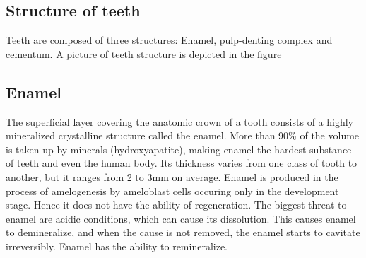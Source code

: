 \subsection{Structure of teeth}
Teeth are composed of three structures: Enamel, pulp-denting complex and cementum. A picture of teeth structure is depicted in the figure

\subsection*{Enamel}
The superficial layer covering the anatomic crown of a tooth consists of a highly mineralized crystalline structure called the enamel. More than 90\% of the volume is taken up by minerals (hydroxyapatite), making enamel the hardest substance of teeth and even the human body. Its thickness varies from one class of tooth to another, but it ranges from 2 to 3mm on average. Enamel is produced in the process of amelogenesis by ameloblast cells occuring only in the development stage. Hence it does not have the ability of regeneration. The biggest threat to enamel are acidic conditions, which can cause its dissolution. This causes enamel to demineralize, and when the cause is not removed, the enamel starts to cavitate irreversibly. Enamel has the ability to remineralize.

